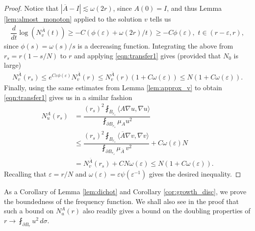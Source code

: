 \documentclass[12pt,leqno]{amsart}
\numberwithin{equation}{section}
\theoremstyle{definition}
\renewcommand{\epsilon}{\varepsilon}
\newcommand{\ra}{\rightarrow}
\newcommand{\abs}[1]{\left \lvert #1 \right \rvert}
\newcommand{\ol}{\overline}
\begin{document}
\begin{proof}
		
		Notice that $\abs{\ol{A} - I} \lesssim \omega(2r)$, since $A(0) = I$, and thus Lemma \ref{lem:almost_monoton} applied to the solution $v$ tells us 
		\begin{align*}
			\dfrac{d}{dt} \log\left(  N_v^{\ol{A}}(t)   \right) \ge - C( \phi(\epsilon) + \omega(2r)/t) \ge -C \phi(\epsilon), \, \, t \in (r-\epsilon, r),
		\end{align*}
		since $\phi(s) = \omega(s)/s$ is a decreasing function. Integrating the above from $r_s = r ( 1-s/N)$ to $r$ and applying \eqref{eqn:transfer1} gives (provided that $N_0$ is large)
		\begin{align}\label{eqn:transfer2}
			N_{v}^{\ol{A}}(r_s) \le  e^{ C \epsilon \phi(\epsilon) } N_v^{\ol{A}}(r) \le N_v^{\ol{A}}(r) (1 + C \omega(\epsilon)) \le N ( 1 + C \omega(\epsilon)).
		\end{align}
		Finally, using the same estimates from Lemma \ref{lem:approx_v} to obtain \eqref{eqn:transfer1} gives us in a similar fashion
		\begin{align*}
			N_u^A(r_s) & = \dfrac{(r_s)^2 \fint_{B_{r_s}} \langle A \nabla u, \nabla u \rangle }{  \fint_{\partial B_{r_s}} \mu_A u^2  } \\
			& \le \dfrac{(r_s)^2 \fint_{B_{r_s}} \langle \ol{A} \nabla v, \nabla v \rangle }{  \fint_{\partial B_{r_s}} \mu_{\ol{A}} \,  v^2  } + C \omega(\epsilon)N \\
			& = N_v^{\ol{A}}(r_s) + C N \omega(\epsilon) \le N( 1 + C \omega(\epsilon)).
		\end{align*}
		Recalling that $\epsilon = r/N$ and $\omega(\epsilon) = \epsilon \psi(\epsilon^{-1})$  gives the desired inequality.
	\end{proof}
	
	
	As a Corollary of Lemma \ref{lem:dichot} and Corollary \ref{cor:growth_disc}, we prove the boundedness of the frequency function. We shall also see in the proof that such a bound on $N_u^A(r)$ also readily gives a bound on  the doubling properties of $r \ra \fint_{\partial B_r} u^2 \, d\sigma$.
	
\end{document}
